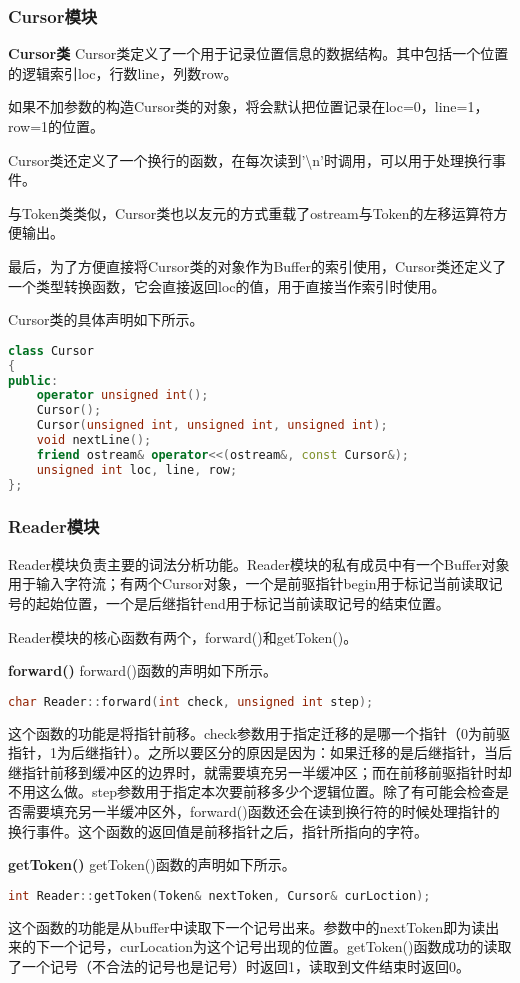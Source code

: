 \documentclass[twocolumn]{article}
\begin{document}
\subsubsection{Cursor模块}
\textbf{Cursor类 }Cursor类定义了一个用于记录位置信息的数据结构。其中包括一个位置的逻辑索引loc，行数line，列数row。

如果不加参数的构造Cursor类的对象，将会默认把位置记录在loc=0，line=1，row=1的位置。

Cursor类还定义了一个换行的函数，在每次读到'\textbackslash n'时调用，可以用于处理换行事件。

与Token类类似，Cursor类也以友元的方式重载了ostream与Token的左移运算符方便输出。

最后，为了方便直接将Cursor类的对象作为Buffer的索引使用，Cursor类还定义了一个类型转换函数，它会直接返回loc的值，用于直接当作索引时使用。

Cursor类的具体声明如下所示。

\begin{lstlisting}[language=C++]
class Cursor
{
public:
    operator unsigned int();
    Cursor();
    Cursor(unsigned int, unsigned int, unsigned int);
    void nextLine();
    friend ostream& operator<<(ostream&, const Cursor&);
    unsigned int loc, line, row;
};
\end{lstlisting}

\subsubsection{Reader模块}
Reader模块负责主要的词法分析功能。Reader模块的私有成员中有一个Buffer对象用于输入字符流；有两个Cursor对象，一个是前驱指针begin用于标记当前读取记号的起始位置，一个是后继指针end用于标记当前读取记号的结束位置。

Reader模块的核心函数有两个，forward()和getToken()。

\textbf{forward() } forward()函数的声明如下所示。
\begin{lstlisting}[language=C++]
char Reader::forward(int check, unsigned int step);
\end{lstlisting}
这个函数的功能是将指针前移。check参数用于指定迁移的是哪一个指针（0为前驱指针，1为后继指针）。之所以要区分的原因是因为：如果迁移的是后继指针，当后继指针前移到缓冲区的边界时，就需要填充另一半缓冲区；而在前移前驱指针时却不用这么做。step参数用于指定本次要前移多少个逻辑位置。除了有可能会检查是否需要填充另一半缓冲区外，forward()函数还会在读到换行符的时候处理指针的换行事件。这个函数的返回值是前移指针之后，指针所指向的字符。

\textbf{getToken() }getToken()函数的声明如下所示。
\begin{lstlisting}[language=C++]
int Reader::getToken(Token& nextToken, Cursor& curLoction);
\end{lstlisting}
这个函数的功能是从buffer中读取下一个记号出来。参数中的nextToken即为读出来的下一个记号，curLocation为这个记号出现的位置。getToken()函数成功的读取了一个记号（不合法的记号也是记号）时返回1，读取到文件结束时返回0。
\end{document}
